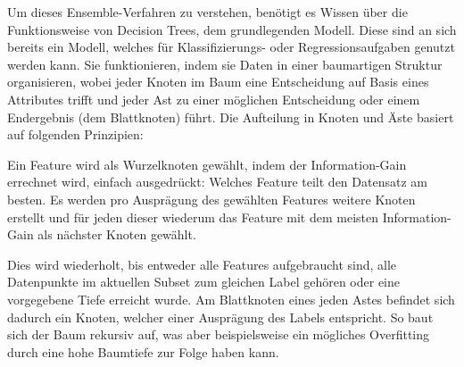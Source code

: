 Um dieses Ensemble-Verfahren zu verstehen, benötigt es Wissen über die Funktionsweise von Decision Trees, dem grundlegenden Modell. Diese sind an sich bereits ein Modell, welches für Klassifizierungs- oder Regressionsaufgaben genutzt werden kann. Sie funktionieren, indem sie Daten in einer baumartigen Struktur organisieren, wobei jeder Knoten im Baum eine Entscheidung auf Basis eines Attributes trifft und jeder Ast zu einer möglichen Entscheidung oder einem Endergebnis (dem Blattknoten) führt. Die Aufteilung in Knoten und Äste basiert auf folgenden Prinzipien:

Ein Feature wird als Wurzelknoten gewählt, indem der Information-Gain errechnet wird, einfach ausgedrückt: Welches Feature teilt den Datensatz am besten. Es werden pro Ausprägung des gewählten Features weitere Knoten erstellt und für jeden dieser wiederum das Feature mit dem meisten Information-Gain als nächster Knoten gewählt.

Dies wird wiederholt, bis entweder alle Features aufgebraucht sind, alle Datenpunkte im aktuellen Subset zum gleichen Label gehören oder eine vorgegebene Tiefe erreicht wurde. Am Blattknoten eines jeden Astes befindet sich dadurch ein Knoten, welcher einer Ausprägung des Labels entspricht. So baut sich der Baum rekursiv auf, was aber beispielsweise ein mögliches Overfitting durch eine hohe Baumtiefe zur Folge haben kann.

